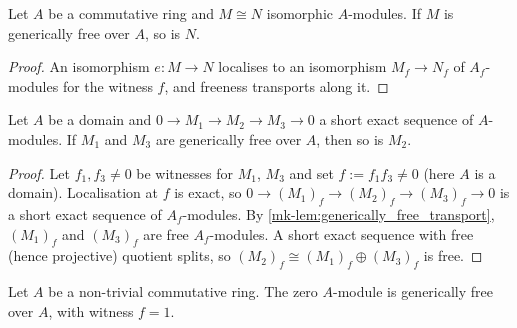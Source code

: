 \begin{lemma}\label{mk-lem:generically_free_of_equiv}
  \leanok

  Let \(A\) be a commutative ring and \(M \cong N\) isomorphic \(A\)-modules.
  If \(M\) is generically free over \(A\), so is \(N\).
\end{lemma}

\begin{proof}
  \leanok
An isomorphism \(e : M \to N\) localises to an isomorphism
  \(M_f \to N_f\) of \(A_f\)-modules for the witness \(f\), and freeness
  transports along it.
\end{proof}

\begin{lemma}\label{mk-lem:generically_free_splice}
  \leanok

  Let \(A\) be a domain and \(0 \to M_1 \to M_2 \to M_3 \to 0\) a short exact
  sequence of \(A\)-modules.  If \(M_1\) and \(M_3\) are generically free over
  \(A\), then so is \(M_2\).
\end{lemma}

\begin{proof}
  \leanok
{}
  Let \(f_1, f_3 \ne 0\) be witnesses for \(M_1\), \(M_3\) and set
  \(f := f_1 f_3 \ne 0\) (here \(A\) is a domain).  Localisation at \(f\) is
  exact, so \(0 \to (M_1)_f \to (M_2)_f \to (M_3)_f \to 0\) is a short exact
  sequence of \(A_f\)-modules.  By
  \ref{mk-lem:generically_free_transport}, \((M_1)_f\) and \((M_3)_f\) are free
  \(A_f\)-modules.  A short exact sequence with free (hence projective)
  quotient splits, so \((M_2)_f \cong (M_1)_f \oplus (M_3)_f\) is free.
\end{proof}

\begin{lemma}\label{mk-lem:generically_free_subsingleton}
  \leanok

  Let \(A\) be a non-trivial commutative ring.  The zero \(A\)-module is
  generically free over \(A\), with witness \(f = 1\).
\end{lemma}

